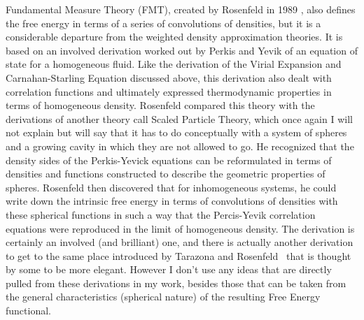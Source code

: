 Fundamental Measure Theory (FMT), created by Rosenfeld in
1989 \cite{rosenfeld1989free,rosenfeld1990free}, also defines the free
energy in terms of a series of convolutions of densities, but it is a
considerable departure from the weighted density approximation
theories.  It is based on an involved derivation worked out by Perkis
and Yevik of an equation of state for a homogeneous fluid.  Like the
derivation of the Virial Expansion and Carnahan-Starling Equation
discussed above, this derivation also dealt with correlation functions
and ultimately expressed thermodynamic properties in terms of
homogeneous density.  Rosenfeld compared this theory with the
derivations of another theory call Scaled Particle Theory, which once
again I will not explain but will say that it has to do conceptually
with a system of spheres and a growing cavity in which they are not
allowed to go.  He recognized that the density sides of the
Perkis-Yevick equations can be reformulated in terms of densities and
functions constructed to describe the geometric properties of spheres.
Rosenfeld then discovered that for inhomogeneous systems, he could
write down the intrinsic free energy in terms of convolutions of
densities with these spherical functions in such a way that the
Percis-Yevik correlation equations were reproduced in the limit of
homogeneous density.  The derivation is certainly an involved (and
brilliant) one, and there is actually another derivation to get to the
same place introduced by Tarazona and
Rosenfeld~\cite{tarazona1997,tarazona1999free,tarazona2000,tarazona2002fundamental}
that is thought by some to be more elegant.  However I don't use any
ideas that are directly pulled from these derivations in my work,
besides those that can be taken from the general characteristics
(spherical nature) of the resulting Free Energy functional.

